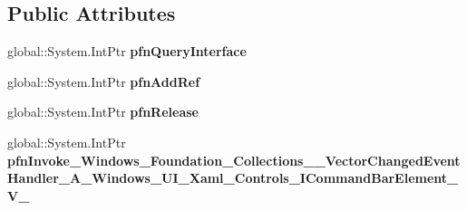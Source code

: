 \subsection*{Public Attributes}
\begin{DoxyCompactItemize}
\item 
\mbox{\label{struct_windows_1_1_foundation_1_1_collections_1_1_vector_changed_event_handler___a___windows___ud3b80c77359cead1f814fa39c92b857f_a129a0bbcb118bc9ed42a57571cbd5f3c}} 
global\+::\+System.\+Int\+Ptr {\bfseries pfn\+Query\+Interface}
\item 
\mbox{\label{struct_windows_1_1_foundation_1_1_collections_1_1_vector_changed_event_handler___a___windows___ud3b80c77359cead1f814fa39c92b857f_a2679dce4973708ff29089f6383273b3f}} 
global\+::\+System.\+Int\+Ptr {\bfseries pfn\+Add\+Ref}
\item 
\mbox{\label{struct_windows_1_1_foundation_1_1_collections_1_1_vector_changed_event_handler___a___windows___ud3b80c77359cead1f814fa39c92b857f_abc52adbf1686f1038af765926244d7b2}} 
global\+::\+System.\+Int\+Ptr {\bfseries pfn\+Release}
\item 
\mbox{\label{struct_windows_1_1_foundation_1_1_collections_1_1_vector_changed_event_handler___a___windows___ud3b80c77359cead1f814fa39c92b857f_a1f24b8ceb38a8b6e9f57edeb328ec937}} 
global\+::\+System.\+Int\+Ptr {\bfseries pfn\+Invoke\+\_\+\+Windows\+\_\+\+Foundation\+\_\+\+Collections\+\_\+\+\_\+\+Vector\+Changed\+Event\+Handler\+\_\+\+A\+\_\+\+Windows\+\_\+\+U\+I\+\_\+\+Xaml\+\_\+\+Controls\+\_\+\+I\+Command\+Bar\+Element\+\_\+\+V\+\_\+}
\end{DoxyCompactItemize}
